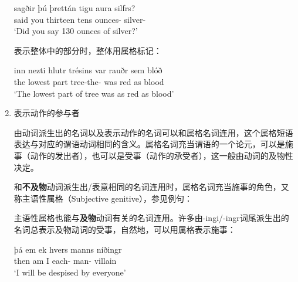 \begin{enumerate}[itemindent=1em]
\begin{exe}
              \ex \gll
              sagðir þú þrettán tigu aura silfrs?\\
              said you thirteen tens ounces-{\acc} silver-{\gen}\\
              \trans `Did you say 130 ounces of silver?'
          \end{exe}

          表示整体中的部分时，整体用属格标记：
          \begin{exe}
              \ex \gll
              inn nezti hlutr trésins var rauðr sem blóð\\
              the lowest part tree-the-{\gen} was red as blood\\
              \trans `The lowest part of tree was as red as blood'
          \end{exe}

    \item 表示动作的参与者

          由动词派生出的名词以及表示动作的名词可以和属格名词连用，这个属格短语表达与对应的谓语动词相同的含义。属格名词充当谓语的一个论元，可以是施事（动作的发出者），也可以是受事（动作的承受者），这一般由动词的及物性决定。

          和\textbf{不及物}动词派生出/表意相同的名词连用时，属格名词充当施事的角色，又称主语性属格（Subjective genitive），参见例句：
          \begin{exe}
              \ex
              \begin{xlist}

              \end{xlist}
          \end{exe}

          主语性属格也能与\textbf{及物}动词有关的名词连用。许多由-ingi/-ingr词尾派生出的名词总表示及物动词的受事，自然地，可以用属格表示施事：
          \begin{exe}
              \ex \gll
              þá em ek hvers manns níðingr\\
              then am I each-{\gen} man-{\gen} villain\\
              \trans `I will be despised by everyone'


\end{exe}
\end{enumerate}

